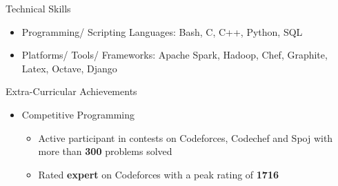 \documentclass{article}
\begin{document}
{\Large Technical Skills}
\renewcommand{\labelitemi}{$\bullet$}
\begin{itemize}[leftmargin=0.82cm]
\item Programming/ Scripting Languages: Bash, C, C++, Python, SQL
\item Platforms/ Tools/ Frameworks: Apache Spark, Hadoop,  Chef, Graphite, Latex, Octave, Django
\end{itemize}
\renewcommand{\labelitemii}{$\bullet$}
{\Large Extra-Curricular Achievements}
\begin{itemize}[leftmargin=0.07cm]
\item[] {\large Competitive Programming}
	\begin{itemize}
	\item Active participant in contests on Codeforces, Codechef and Spoj with more than \textbf{300} problems solved
	\item Rated \textbf{expert} on Codeforces with a peak rating of \textbf{1716}
	\end{itemize}
\end{itemize}
\end{document}
